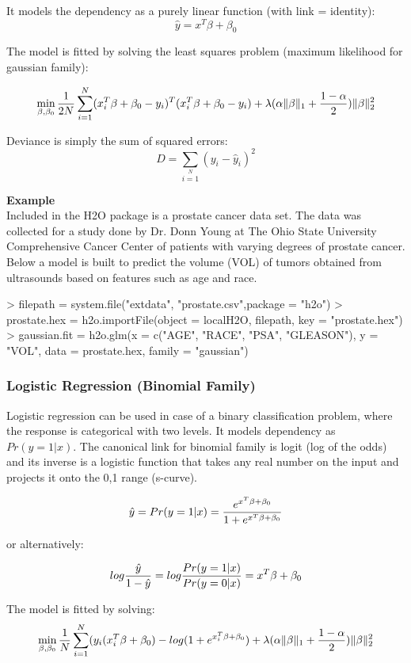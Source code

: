 \documentclass[11pt]{article}
\begin{document}
It models the dependency as a purely linear function (with link = identity):
\[ \hat{y} = x^T\beta + \beta_0\]

The model is fitted by solving the least squares problem (maximum likelihood for gaussian family):

\[ \min\limits_{\beta,\beta_0} { {1 \over 2N}\sum\limits_{i=1}\limits^{N}(x_i^{T}\beta  + \beta_0- y_i)^T (x_i^{T}\beta + \beta_0 - y_i)  + \lambda (\alpha \|\beta \|_1 + {1-\alpha \over 2}) \| \beta \|_2^2} \]


Deviance is simply the sum of squared errors:
\[ D = \sum\limits_{i=1}\limits^{N}{(y_i - \hat{y}_i)^2} \]


\textbf{Example}\\
Included in the H2O package is a prostate cancer data set. The data was collected for a study done by Dr. Donn Young at The Ohio State University Comprehensive Cancer Center of patients with varying degrees of prostate cancer. Below a model is built to predict the volume (VOL) of tumors obtained from ultrasounds based on features such as age and race.

\begin{spverbatim}
> filepath = system.file("extdata", "prostate.csv",package = "h2o")
> prostate.hex = h2o.importFile(object = localH2O, filepath, key = "prostate.hex")
> gaussian.fit = h2o.glm(x = c("AGE", "RACE", "PSA", "GLEASON"), y = "VOL", data = prostate.hex, family = "gaussian")
\end{spverbatim}

\subsubsection{Logistic Regression (Binomial Family)}
Logistic regression can be used in case of a binary classification problem, where the response is categorical with two levels. It models dependency as $Pr(y = 1|x)$. The canonical link for binomial family is logit (log of the odds) and its inverse is a logistic function that takes any real number on the input and projects it onto the 0,1 range (s-curve). 

\[ \hat{y} = Pr(y = 1|x) = {e^{x^T\beta + \beta_0} \over 1 + e^{x^T \beta + \beta_0} } \]

or alternatively:


\[log {\hat{y} \over 1- \hat{y}} = log{Pr(y=1|x) \over Pr(y=0|x)} = x^T \beta + \beta_0\]

The model is fitted by solving:
\[  \min\limits_{\beta,\beta_0} { {1 \over N}\sum\limits_{i=1}\limits^{N}(y_i (x_i^{T}\beta  + \beta_0) - log (1 + e^{x_i^{T}\beta  + \beta_0} )  + \lambda (\alpha \|\beta \|_1 + {1-\alpha \over 2}) \| \beta \|_2^2} \]
\end{document}
